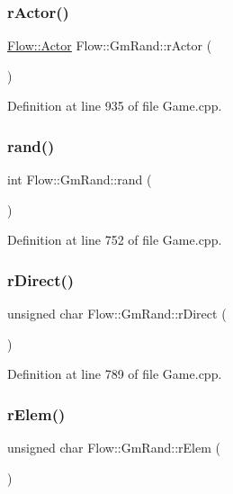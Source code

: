 \subsubsection{\texorpdfstring{r\+Actor()}{rActor()}}
{\footnotesize\ttfamily \hyperlink{class_flow_1_1_actor}{Flow\+::\+Actor} Flow\+::\+Gm\+Rand\+::r\+Actor (\begin{DoxyParamCaption}{ }\end{DoxyParamCaption})}



Definition at line 935 of file Game.\+cpp.

\hypertarget{class_flow_1_1_gm_rand_a638c37993080f31a9857d11c284c15b5}{}\label{class_flow_1_1_gm_rand_a638c37993080f31a9857d11c284c15b5} 
\subsubsection{\texorpdfstring{rand()}{rand()}}
{\footnotesize\ttfamily int Flow\+::\+Gm\+Rand\+::rand (\begin{DoxyParamCaption}{ }\end{DoxyParamCaption})}



Definition at line 752 of file Game.\+cpp.

\hypertarget{class_flow_1_1_gm_rand_aeb38e9d08aae7a5d4788facf408b01dc}{}\label{class_flow_1_1_gm_rand_aeb38e9d08aae7a5d4788facf408b01dc} 
\subsubsection{\texorpdfstring{r\+Direct()}{rDirect()}}
{\footnotesize\ttfamily unsigned char Flow\+::\+Gm\+Rand\+::r\+Direct (\begin{DoxyParamCaption}{ }\end{DoxyParamCaption})}



Definition at line 789 of file Game.\+cpp.

\hypertarget{class_flow_1_1_gm_rand_a7df923fe60c18e20a157de7aa599f533}{}\label{class_flow_1_1_gm_rand_a7df923fe60c18e20a157de7aa599f533} 
\subsubsection{\texorpdfstring{r\+Elem()}{rElem()}}
{\footnotesize\ttfamily unsigned char Flow\+::\+Gm\+Rand\+::r\+Elem (\begin{DoxyParamCaption}{ }\end{DoxyParamCaption})}

